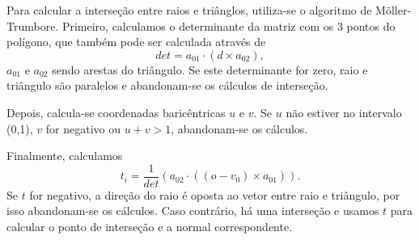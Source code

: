 \documentclass{article}
\begin{document}
        \par
        Para calcular a interseção entre raios e triânglos, utiliza-se o algoritmo de Möller-Trumbore. Primeiro, calculamos o determinante da matriz com os 3 pontos do polígono, que também pode ser calculada através de 
        $$
            det = a_{01} \cdot (d \times a_{02} ),
        $$
        $a_{01}$ e $a_{02}$ sendo arestas do triângulo. Se este determinante for zero, raio e triângulo são paralelos e abandonam-se os cálculos de interseção.
        \par
        Depois, calcula-se coordenadas baricêntricas $u$ e $v$. Se $u$ não estiver no intervalo (0,1), $v$ for negativo ou $u + v > 1$, abandonam-se os cálculos.
        \par
        Finalmente, calculamos
        $$
            t_i = \frac{1}{det} (a_{02} \cdot ((o -v_0) \times a_{01})).
        $$
        Se $t$ for negativo, a direção do raio é oposta ao vetor entre raio e triângulo, por isso abandonam-se os cálculos. Caso contrário, há uma interseção e usamos $t$ para calcular o ponto de interseção e a normal correspondente.
\end{document}
